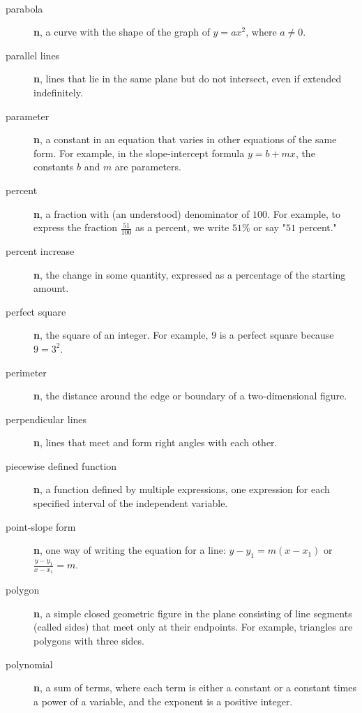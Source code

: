 \documentclass[10pt,]{book}
\newcommand{\terminology}[1]{\textbf{#1}}
\theoremstyle{plain}
\theoremstyle{definition}
\theoremstyle{definition}
\theoremstyle{definition}
\numberwithin{equation}{part}
\begin{document}
\paragraph[{}]{}\hypertarget{paragraphs-19}{}
\leavevmode%
\begin{description}
\item[{parabola}]\hypertarget{li-713}{}\terminology{n}, a curve with the shape of the graph of \(y = ax^2\), where \(a\ne 0\).%
\item[{parallel lines}]\hypertarget{li-714}{}\terminology{n}, lines that lie in the same plane but do not intersect, even if extended indefinitely.%
\item[{parameter}]\hypertarget{li-715}{}\terminology{n}, a constant in an equation that varies in other equations of the same form. For example, in the slope-intercept formula \(y = b + mx\), the constants \(b\) and \(m\) are parameters.%
\item[{percent}]\hypertarget{li-716}{}\terminology{n}, a fraction with (an understood) denominator of \(100\). For example, to express the fraction \(\frac{51}{100}\) as a percent, we write \(51\%\) or say "\(51\) percent."%
\item[{percent increase}]\hypertarget{li-717}{}\terminology{n}, the change in some quantity, expressed as a percentage of the starting amount.%
\item[{perfect square}]\hypertarget{li-718}{}\terminology{n}, the square of an integer. For example, \(9\) is a perfect square because \(9 = 3^2\).%
\item[{perimeter}]\hypertarget{li-719}{}\terminology{n}, the distance around the edge or boundary of a  two-dimensional figure.%
\item[{perpendicular lines}]\hypertarget{li-720}{}\terminology{n}, lines that meet and form right angles with each other.%
\item[{piecewise defined function}]\hypertarget{li-721}{}\terminology{n}, a function defined by multiple expressions, one expression for each specified interval of the independent variable.%
\item[{point-slope form}]\hypertarget{li-722}{}\terminology{n}, one way of writing the equation for a line: \(y-y_1=m(x-x_1)\) or \(\frac{y−y_1}{x−x_1}= m\).%
\item[{polygon}]\hypertarget{li-723}{}\terminology{n}, a simple closed geometric figure in the plane consisting of line segments (called sides) that meet only at their endpoints. For example, triangles are polygons with three sides.%
\item[{polynomial}]\hypertarget{li-724}{}\terminology{n}, a sum of terms, where each term is either a constant or a constant times a power of a variable, and the exponent is a positive integer.%

\end{description}
\end{document}

